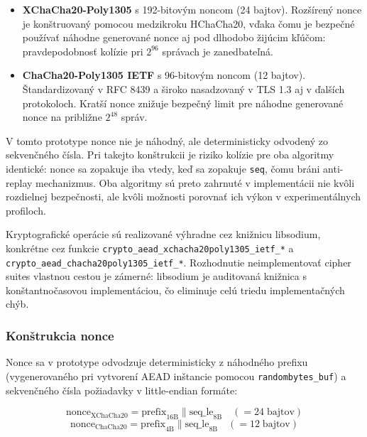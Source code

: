 \documentclass[journal,a4paper,onecolumn]{IEEEtran}
\begin{document}
\begin{itemize}[leftmargin=*,itemsep=2pt]
  \item \textbf{XChaCha20-Poly1305} s 192-bitovým noncom (24 bajtov). Rozšírený nonce je konštruovaný pomocou medzikroku HChaCha20, vďaka čomu je bezpečné používať náhodne generované nonce aj pod dlhodobo žijúcim kľúčom: pravdepodobnosť kolízie pri $2^{96}$ správach je zanedbateľná\cite{XChaChaDraft,LibsodiumXChaChaDoc}.
  \item \textbf{ChaCha20-Poly1305 IETF} s 96-bitovým noncom (12 bajtov). Štandardizovaný v RFC 8439 a široko nasadzovaný v TLS 1.3 aj v ďalších protokoloch\cite{RFC8439}. Kratší nonce znižuje bezpečný limit pre náhodne generované nonce na približne $2^{48}$ správ.
\end{itemize}

V tomto prototype nonce nie je náhodný, ale deterministicky odvodený zo sekvenčného čísla. Pri takejto konštrukcii je riziko kolízie pre oba algoritmy identické: nonce sa zopakuje iba vtedy, keď sa zopakuje \texttt{seq}, čomu bráni anti-replay mechanizmus. Oba algoritmy sú preto zahrnuté v implementácii nie kvôli rozdielnej bezpečnosti, ale kvôli možnosti porovnať ich výkon v experimentálnych profiloch.

Kryptografické operácie sú realizované výhradne cez knižnicu libsodium, konkrétne cez funkcie \texttt{crypto\_aead\_xchacha20poly1305\_ietf\_*} a \texttt{crypto\_aead\_chacha20poly1305\_ietf\_*}. Rozhodnutie neimplementovať cipher suites vlastnou cestou je zámerné: libsodium je auditovaná knižnica s konštantnočasovou implementáciou, čo eliminuje celú triedu implementačných chýb\cite{LibsodiumXChaChaDoc}.

\subsubsection{Konštrukcia nonce}

Nonce sa v prototype odvodzuje deterministicky z náhodného prefixu (vygenerovaného pri vytvorení AEAD inštancie pomocou \texttt{randombytes\_buf}) a sekvenčného čísla požiadavky v little-endian formáte:

\begin{equation}
\text{nonce}_{\text{XChaCha20}} = \text{prefix}_{16\text{B}} \parallel \text{seq\_le}_{8\text{B}} \quad (= 24\;\text{bajtov})
\end{equation}
\begin{equation}
\text{nonce}_{\text{ChaCha20}} = \text{prefix}_{4\text{B}} \parallel \text{seq\_le}_{8\text{B}} \quad (= 12\;\text{bajtov})
\end{equation}
\end{document}
